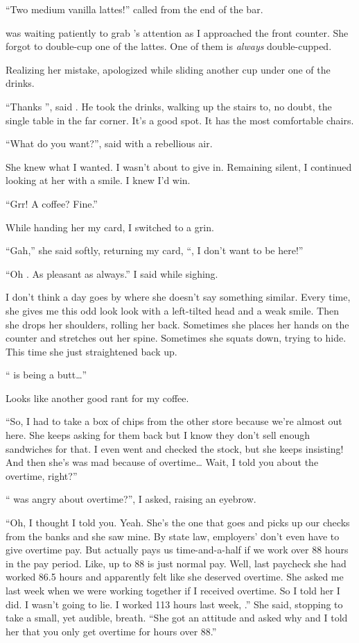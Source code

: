 ``Two medium vanilla lattes!'' \april{} called from the end of the bar.
\VV


\noindent
\dameon{} was waiting patiently to grab \april's attention
as I approached the front counter.
She forgot to double-cup one of the lattes.
One of them is \textit{always} double-cupped.
\VV


\noindent
Realizing her mistake, \april{} apologized while sliding another cup
under one of the drinks.
\VV


``Thanks \april'', said \dameon{}.
He took the drinks, walking up the stairs to, no doubt, the single table
in the far corner.  It's a good spot. It has the most comfortable chairs.
\VV


``What do you want?'', \april{} said with a rebellious air.
\VV


\noindent
She knew what I wanted. I wasn't about to give in.
Remaining silent, I continued looking at her with a smile.
I knew I'd win.
\VV


``Grr! A coffee? Fine.''
\VV


\noindent
While handing her my card, I switched to a grin.
\VV


``Gah,'' she said softly, returning my card,
``\josh, I don't want to be here!''


``Oh \april. As pleasant as always.''  I said while sighing.
\VV


\noindent
I don't think a day goes by where she doesn't say something similar.
Every time, she gives me this odd look look with a left-tilted head
and a weak smile.  Then she drops her shoulders, rolling her back.
Sometimes she places her hands on the counter and stretches out her spine.
Sometimes she squats down, trying to hide.
This time she just straightened back up.
\VV


``\jasmine{} is being a butt\ldots''
\VV


\noindent
Looks like another good rant for my coffee.
\VV


``So, I had to take a box of chips from the other store
because we're almost out here.  She keeps asking for them back
but I know they don't sell enough sandwiches for that.
I even went and checked the stock, but she keeps insisting!
And then she's was mad because of overtime\ldots{}
Wait, I told you about the overtime, right?''
\VV


``\jasmine{} was angry about overtime?'', I asked, raising an eyebrow.
\VV


``Oh, I thought I told you.
Yeah. She's the one that goes and picks up our checks from the banks
and she saw mine.  By state law, employers' don't even have to
give overtime pay.  But \mike{} actually pays us time-and-a-half if
we work over 88 hours in the pay period.
Like, up to 88 is just normal pay.
Well, last paycheck she had worked 86.5 hours and apparently felt like
she deserved overtime.  She asked me last week when we were working together
if I received overtime.  So I told her I did.  I wasn't going to lie.
I worked 113 hours last week, \josh.''
She said, stopping to take a small, yet audible, breath.
``She got an attitude and asked why and I told her that you only get overtime
for hours over 88.''
\VV


